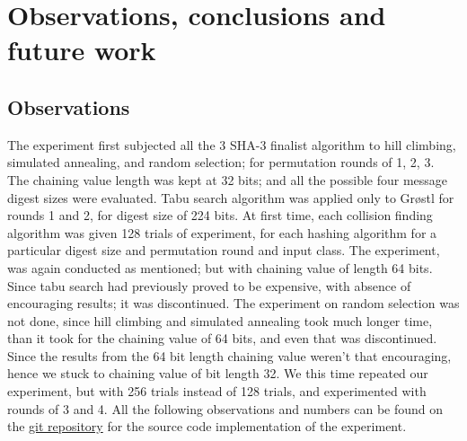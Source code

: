 \chapter{Observations, conclusions and future work}





\section{Observations}
The experiment first subjected all the 3 SHA-3 finalist algorithm to hill climbing, simulated annealing, and
random selection; for permutation rounds of 1, 2, 3. The chaining value length was kept at 32 bits; and all
the possible four message digest sizes were evaluated. Tabu search algorithm was applied only to Gr{\o}stl
for rounds 1 and 2, for digest size of 224 bits. At first time, each collision finding algorithm was given
128 trials of experiment, for each hashing algorithm for a particular digest size and permutation round and
input class. The experiment, was again conducted as mentioned; but with chaining value of length 64 bits. Since
tabu search had previously proved to be expensive, with absence of encouraging results; it was discontinued.
The experiment on random selection was not done, since hill climbing and simulated annealing took much longer
time, than it took for the chaining value of 64 bits, and even that was discontinued. Since the results from
the 64 bit length chaining value weren't that encouraging, hence we stuck to chaining value of bit length 32.
We this time repeated our experiment, but with 256 trials instead of 128 trials, and experimented with rounds
of 3 and 4. All the following observations and numbers can be found on the 
\href{https://github.com/sxs9174/MSProjectCode/tree/master/MSProjectCode/Output}{git repository} for the source
code implementation of the experiment.


